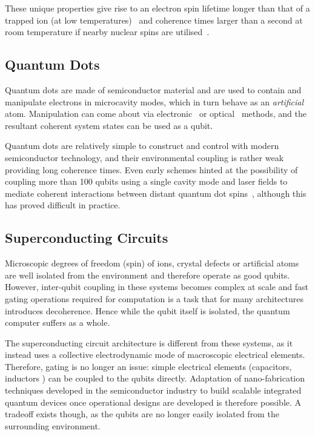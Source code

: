 These unique properties give rise to an electron spin lifetime longer than that of a trapped ion (at low temperatures)~\cite{Jarmola2012} and coherence times larger than a second at room temperature if nearby nuclear spins are utilised~\cite{Maurer2012}.

\subsection{Quantum Dots}
Quantum dots are made of semiconductor material and are used to contain and manipulate electrons in microcavity modes, which in turn behave as an \textit{artificial} atom.
Manipulation can come about via electronic~\cite{Chang1974} or optical~\cite{Dingle1974} methods, and the resultant coherent system states can be used as a qubit.

Quantum dots are relatively simple to construct and control with modern semiconductor technology, and their environmental coupling is rather weak providing long coherence times.
Even early schemes hinted at the possibility of coupling more than 100 qubits using a single cavity mode and laser fields to mediate coherent interactions between distant quantum dot spins~\cite{Imamoglu1999}, although this has proved difficult in practice.

\subsection{Superconducting Circuits}

Microscopic degrees of freedom (\eg spin) of ions, crystal defects or artificial atoms are well isolated from the environment and therefore operate as good qubits.
However, inter-qubit coupling in these systems becomes complex at scale and fast gating operations required for computation is a task that for many architectures introduces decoherence.
Hence while the qubit itself is isolated, the quantum computer suffers as a whole.

The superconducting circuit architecture is different from these systems, as it instead uses a collective electrodynamic mode of macroscopic electrical elements.
Therefore, gating is no longer an issue: simple electrical elements (capacitors, inductors \etc) can be coupled to the qubits directly.
Adaptation of nano-fabrication techniques developed in the semiconductor industry to build scalable integrated quantum devices once operational designs are developed is therefore possible.
A tradeoff exists though, as the qubits are no longer easily isolated from the surrounding environment.

